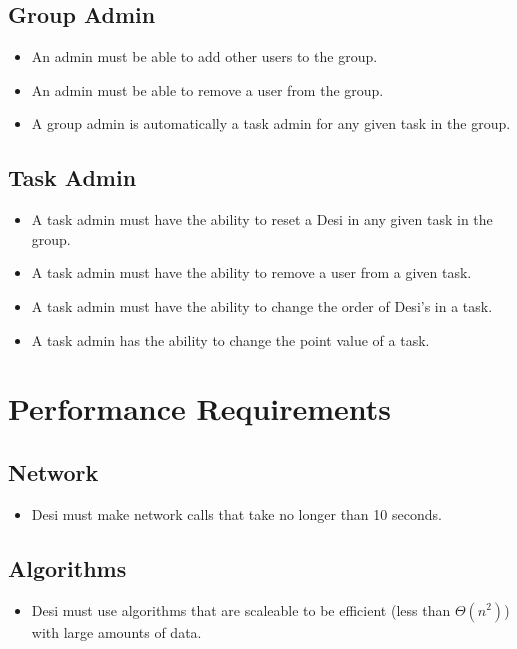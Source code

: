 \documentclass[11pt, a4paper]{report}
\begin{document}
\subsection{Group Admin}
\begin{itemize}
\item An admin must be able to add other users to the group.
\item An admin must be able to remove a user from the group.
\item A group admin is automatically a task admin for any given task in the group.
\end{itemize}


\subsection{Task Admin}
\begin{itemize}
\item A task admin must have the ability to reset a Desi in any given task in the group.
\item A task admin must have the ability to remove a user from a given task.
\item A task admin must have the ability to change the order of Desi's in a task.
\item A task admin has the ability to change the point value of a task.
\end{itemize}


\section{Performance Requirements}
\subsection{Network}
\begin{itemize}
\item Desi must make network calls that take no longer than 10 seconds.
\end{itemize}
\subsection{Algorithms}
\begin{itemize}
\item Desi must use algorithms that are scaleable to be efficient (less than $\Theta(n^2)$) with large amounts of data.
\end{itemize}
\end{document}
